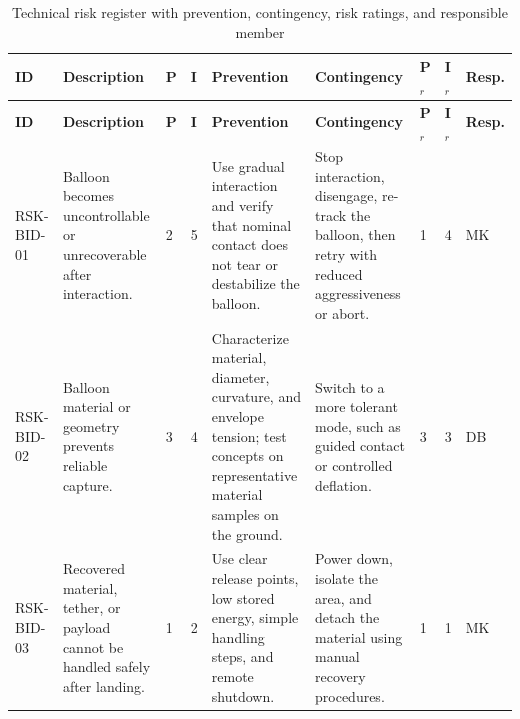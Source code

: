 \vspace{-20pt}
\setlength{\LTleft}{0pt}
\setlength{\LTright}{0pt}
\renewcommand{\arraystretch}{1.1}
\setlength{\tabcolsep}{1.2pt}

\begin{xltabular}{\textwidth}{|p{0.045\textwidth}|
                  X|
                  p{0.015\textwidth}|
                  p{0.015\textwidth}|
                  X|
                  X|
                  p{0.02\textwidth}|
                  p{0.02\textwidth}|
                  p{0.055\textwidth}|}
\caption{Technical risk register with prevention, contingency, risk ratings, and responsible member}
\label{tab:tech_risk_register} \\
\hline
\textbf{ID} & \textbf{Description} & \textbf{P} & \textbf{I} & \textbf{Prevention} & \textbf{Contingency} & \textbf{P$_r$} & \textbf{I$_r$} & \textbf{Resp.} \\ \hline
\endfirsthead

\hline
\textbf{ID} & \textbf{Description} & \textbf{P} & \textbf{I} & \textbf{Prevention} & \textbf{Contingency} & \textbf{P$_r$} & \textbf{I$_r$} & \textbf{Resp.} \\ \hline
\endhead

\hline
\endfoot

RSK-BID-01 & Balloon becomes uncontrollable or unrecoverable after interaction. & 2 & 5 & Use gradual interaction and verify that nominal contact does not tear or destabilize the balloon. & Stop interaction, disengage, re-track the balloon, then retry with reduced aggressiveness or abort. & 1 & 4 & MK \\ \hline
RSK-BID-02 & Balloon material or geometry prevents reliable capture. & 3 & 4 & Characterize material, diameter, curvature, and envelope tension; test concepts on representative material samples on the ground. & Switch to a more tolerant mode, such as guided contact or controlled deflation. & 3 & 3 & DB \\ \hline
RSK-BID-03 & Recovered material, tether, or payload cannot be handled safely after landing. & 1 & 2 & Use clear release points, low stored energy, simple handling steps, and remote shutdown. & Power down, isolate the area, and detach the material using manual recovery procedures. & 1 & 1 & MK \\ \hline


\end{xltabular}
